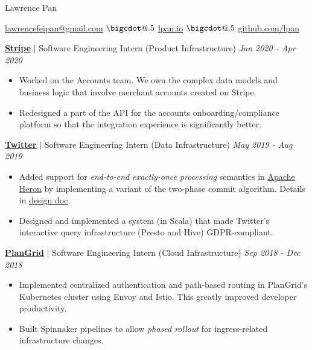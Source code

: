 \documentclass[paper=a4,fontsize=15pt]{scrartcl}
\makeatletter
\newcommand*\bigcdot{\mathpalette\bigcdot@{.5}}
\newcommand*\bigcdot@[2]{\mathbin{\vcenter{\hbox{\scalebox{#2}{$\m@th#1\bullet$}}}}}
\newcommand{\smolboispace}{\vspace*{0.1em}}
\newcommand{\halfspace}{\vspace*{0.5em}}
\newcommand{\bighalfspace}{\vspace*{0.75em}}
\newcommand{\http}[1]{\href{http://#1}{\ul{#1}}}
\newcommand{\https}[1]{\href{https://#1}{\ul{#1}}}
\newcommand{\email}[1]{\href{mailto:#1}{\ul{#1}}}
\makeatother
\begin{document}
\begin{center}
  {\fontsize{35}{40}\selectfont Lawrence Pan \par}
  \halfspace
  \smolboispace
  \smolboispace

  {\normalsize
    \email{lawrencefeipan@gmail.com}
    $\bigcdot$ \http{lpan.io}
    $\bigcdot$ \https{github.com/lpan}
    \par}
\end{center}

\bighalfspace
\normalsize
\noindent \href{https://stripe.com}{\textbf{\ul{Stripe}}}
$\vert$ \small Software Engineering Intern (Product Infrastructure)
{\hfill \footnotesize \textit{Jan 2020 - Apr 2020}}
\begin{itemize}[noitemsep,leftmargin=20pt,label=\raisebox{0.25ex}{\tiny$\bullet$},topsep=5pt]
  \small
  \item Worked on the Accounts team. We own the complex data models and business
    logic that involve merchant accounts created on Stripe.
  \item Redesigned a part of the API for the accounts onboarding/compliance
    platform so that the integration experience is significantly better.
\end{itemize}

\smolboispace
\smolboispace
\bighalfspace
\normalsize
\noindent \href{https://twitter.com}{\textbf{\ul{Twitter}}}
$\vert$ \small Software Engineering Intern (Data Infrastructure)
{\hfill \footnotesize \textit{May 2019 - Aug 2019}}
\begin{itemize}[noitemsep,leftmargin=20pt,label=\raisebox{0.25ex}{\tiny$\bullet$},topsep=5pt]
  \small
  \item Added support for \textit{end-to-end exactly-once processing} semantics
    in \href{https://apache.github.io/incubator-heron/}{\ul{Apache Heron}} by
    implementing a variant of the two-phase commit algorithm. Details in
    \href{https://docs.google.com/document/d/1Shqp2z-uAhsOUN2erbc2d-72wdjA8anp}{\ul{design
        doc}}.
  \item Designed and implemented a system (in Scala) that made Twitter's
    interactive query infrastructure (Presto and Hive) GDPR-compliant.
\end{itemize}

\smolboispace
\smolboispace
\bighalfspace
\normalsize
\noindent \href{https://plangrid.com}{\textbf{\ul{PlanGrid}}}
$\vert$ \small Software Engineering Intern (Cloud Infrastructure)
{\hfill \footnotesize \textit{Sep 2018 - Dec 2018}}
\begin{itemize}[noitemsep,leftmargin=20pt,label=\raisebox{0.25ex}{\tiny$\bullet$},topsep=5pt]
  \small
  \item Implemented centralized authentication and path-based routing in
    PlanGrid's Kubernetes cluster using Envoy and Istio. This greatly improved
    developer productivity.
  \item Built Spinnaker pipelines to allow \textit{phased rollout} for
    ingress-related infrastructure changes.
\end{itemize}
\end{document}
